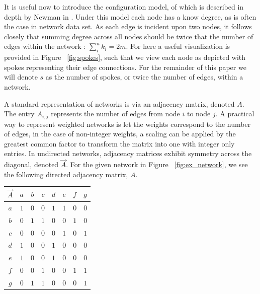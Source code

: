 \documentclass[a4paper, 10pt, twocolumn]{article}
\begin{document}
It is useful now to introduce the configuration model, of which is described in depth by Newman in \cite{networks}.
Under this model each node has a know degree, as is often the case in network data set.
As each edge is incident upon two nodes, it follows closely that summing degree across all nodes should be twice that the number of edges within the network : $ \sum_{i}^{n} k_{i} = 2m $.
For here a useful visualization is provided in Figure ~\ref{fig:spokes}, such that we view each node as depicted with spokes representing their edge connections.
For the remainder of this paper we will denote $ s $ as the number of spokes, or twice the number of edges, within a network.

A standard representation of networks is via an adjacency matrix, denoted $ A $.
The entry $ A_{i,j} $ represents the number of edges from node $ i $ to node $ j $.
A practical way to represent weighted networks is let the weights correspond to the number of edges, in the case of non-integer weights, a scaling can be applied by the greatest common factor to transform the matrix into one with integer only entries.
In undirected networks, adjacency matrices exhibit symmetry across the diagonal, denoted $ \vec{A} $.
For the given network in Figure ~\ref{fig:ex_network}, we see the following directed adjacency matrix, $ A $.

\begin{center}
       \begin{tabular}{c|ccccccc}
              $ \vec{A} $ & $ a $ & $ b $ & $ c $ & $ d $ & $ e $ & $ f $ & $ g $ \\
              \hline
              $ a $ & $ 1 $ & $ 0 $ & $ 0 $ & $ 1 $ & $ 1 $ & $ 0 $ & $ 0 $ \\
              $ b $ & $ 0 $ & $ 1 $ & $ 1 $ & $ 0 $ & $ 0 $ & $ 1 $ & $ 0 $ \\
              $ c $ & $ 0 $ & $ 0 $ & $ 0 $ & $ 0 $ & $ 1 $ & $ 0 $ & $ 1 $ \\
              $ d $ & $ 1 $ & $ 0 $ & $ 0 $ & $ 1 $ & $ 0 $ & $ 0 $ & $ 0 $ \\
              $ e $ & $ 1 $ & $ 0 $ & $ 0 $ & $ 1 $ & $ 0 $ & $ 0 $ & $ 0 $ \\
              $ f $ & $ 0 $ & $ 0 $ & $ 1 $ & $ 0 $ & $ 0 $ & $ 1 $ & $ 1 $ \\
              $ g $ & $ 0 $ & $ 1 $ & $ 1 $ & $ 0 $ & $ 0 $ & $ 0 $ & $ 1 $ \\
       \end{tabular}
\end{center}
\end{document}
